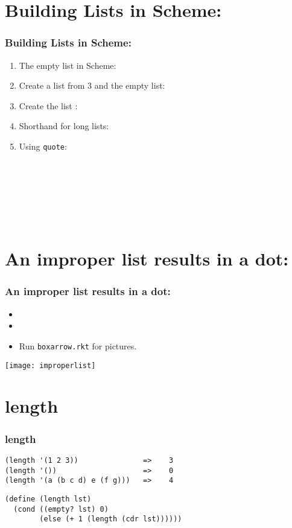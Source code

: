 \documentclass{beamer}
\newcommand{\sect}[1]{
\section{#1}
\begin{frame}[fragile]\frametitle{#1}
}
\begin{document}
\sect{Building Lists in Scheme:}
\begin{enumerate}
\item The empty list in Scheme:  
\item Create a list from 3 and the empty list: 
\item Create the list :
\item Shorthand for long lists:
\pause
\item Using {\tt quote}:
  \\
  \\
  \\
  \\
  \\
  \\
  \\
  
\end{enumerate}

\end{frame}


\sect{An improper list results in a dot:}
\begin{itemize}
\item {}
\item {}
\item Run {\tt boxarrow.rkt} for pictures.
\end{itemize}
\texttt{[image: improperlist]}
\end{frame}

\sect{length}
\begin{Verbatim}
(length '(1 2 3))               =>    3
(length '())                    =>    0
(length '(a (b c d) e (f g)))   =>    4
\end{Verbatim}
\vfill

\pause
\begin{Verbatim}
(define (length lst)
  (cond ((empty? lst) 0)
        (else (+ 1 (length (cdr lst))))))
\end{Verbatim}
\end{frame}
\end{document}
